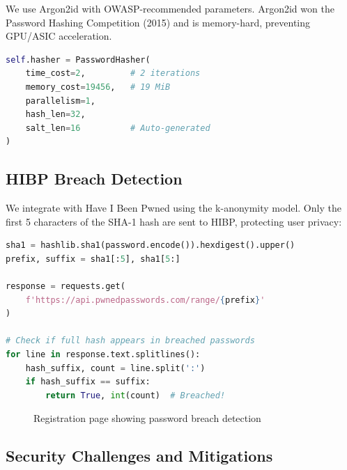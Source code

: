\documentclass[12pt,a4paper]{article}
\begin{document}
We use Argon2id with OWASP-recommended parameters. Argon2id won the Password Hashing Competition (2015) and is memory-hard, preventing GPU/ASIC acceleration.

\begin{lstlisting}[language=Python]
self.hasher = PasswordHasher(
    time_cost=2,         # 2 iterations
    memory_cost=19456,   # 19 MiB
    parallelism=1,
    hash_len=32,
    salt_len=16          # Auto-generated
)
\end{lstlisting}

\subsection{HIBP Breach Detection}

We integrate with Have I Been Pwned using the k-anonymity model. Only the first 5 characters of the SHA-1 hash are sent to HIBP, protecting user privacy:

\begin{lstlisting}[language=Python]
sha1 = hashlib.sha1(password.encode()).hexdigest().upper()
prefix, suffix = sha1[:5], sha1[5:]

response = requests.get(
    f'https://api.pwnedpasswords.com/range/{prefix}'
)

# Check if full hash appears in breached passwords
for line in response.text.splitlines():
    hash_suffix, count = line.split(':')
    if hash_suffix == suffix:
        return True, int(count)  # Breached!
\end{lstlisting}

\begin{figure}[H]
    \centering
    \caption{Registration page showing password breach detection}
    \label{fig:hibp}
\end{figure}

\subsection{Security Challenges and Mitigations}
\end{document}
